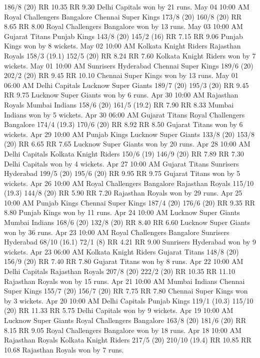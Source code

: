 186/8 (20)
RR 10.35
RR 9.30
Delhi Capitals won by 21 runs.
May 04
10:00 AM
Royal Challengers Bangalore
Chennai Super Kings
173/8 (20)
160/8 (20)
RR 8.65
RR 8.00
Royal Challengers Bangalore won by 13 runs.
May 03
10:00 AM
Gujarat Titans
Punjab Kings
143/8 (20)
145/2 (16)
RR 7.15
RR 9.06
Punjab Kings won by 8 wickets.
May 02
10:00 AM
Kolkata Knight Riders
Rajasthan Royals
158/3 (19.1)
152/5 (20)
RR 8.24
RR 7.60
Kolkata Knight Riders won by 7 wickets.
May 01
10:00 AM
Sunrisers Hyderabad
Chennai Super Kings
189/6 (20)
202/2 (20)
RR 9.45
RR 10.10
Chennai Super Kings won by 13 runs.
May 01
06:00 AM
Delhi Capitals
Lucknow Super Giants
189/7 (20)
195/3 (20)
RR 9.45
RR 9.75
Lucknow Super Giants won by 6 runs.
Apr 30
10:00 AM
Rajasthan Royals
Mumbai Indians
158/6 (20)
161/5 (19.2)
RR 7.90
RR 8.33
Mumbai Indians won by 5 wickets.
Apr 30
06:00 AM
Gujarat Titans
Royal Challengers Bangalore
174/4 (19.3)
170/6 (20)
RR 8.92
RR 8.50
Gujarat Titans won by 6 wickets.
Apr 29
10:00 AM
Punjab Kings
Lucknow Super Giants
133/8 (20)
153/8 (20)
RR 6.65
RR 7.65
Lucknow Super Giants won by 20 runs.
Apr 28
10:00 AM
Delhi Capitals
Kolkata Knight Riders
150/6 (19)
146/9 (20)
RR 7.89
RR 7.30
Delhi Capitals won by 4 wickets.
Apr 27
10:00 AM
Gujarat Titans
Sunrisers Hyderabad
199/5 (20)
195/6 (20)
RR 9.95
RR 9.75
Gujarat Titans won by 5 wickets.
Apr 26
10:00 AM
Royal Challengers Bangalore
Rajasthan Royals
115/10 (19.3)
144/8 (20)
RR 5.90
RR 7.20
Rajasthan Royals won by 29 runs.
Apr 25
10:00 AM
Punjab Kings
Chennai Super Kings
187/4 (20)
176/6 (20)
RR 9.35
RR 8.80
Punjab Kings won by 11 runs.
Apr 24
10:00 AM
Lucknow Super Giants
Mumbai Indians
168/6 (20)
132/8 (20)
RR 8.40
RR 6.60
Lucknow Super Giants won by 36 runs.
Apr 23
10:00 AM
Royal Challengers Bangalore
Sunrisers Hyderabad
68/10 (16.1)
72/1 (8)
RR 4.21
RR 9.00
Sunrisers Hyderabad won by 9 wickets.
Apr 23
06:00 AM
Kolkata Knight Riders
Gujarat Titans
148/8 (20)
156/9 (20)
RR 7.40
RR 7.80
Gujarat Titans won by 8 runs.
Apr 22
10:00 AM
Delhi Capitals
Rajasthan Royals
207/8 (20)
222/2 (20)
RR 10.35
RR 11.10
Rajasthan Royals won by 15 runs.
Apr 21
10:00 AM
Mumbai Indians
Chennai Super Kings
155/7 (20)
156/7 (20)
RR 7.75
RR 7.80
Chennai Super Kings won by 3 wickets.
Apr 20
10:00 AM
Delhi Capitals
Punjab Kings
119/1 (10.3)
115/10 (20)
RR 11.33
RR 5.75
Delhi Capitals won by 9 wickets.
Apr 19
10:00 AM
Lucknow Super Giants
Royal Challengers Bangalore
163/8 (20)
181/6 (20)
RR 8.15
RR 9.05
Royal Challengers Bangalore won by 18 runs.
Apr 18
10:00 AM
Rajasthan Royals
Kolkata Knight Riders
217/5 (20)
210/10 (19.4)
RR 10.85
RR 10.68
Rajasthan Royals won by 7 runs.
